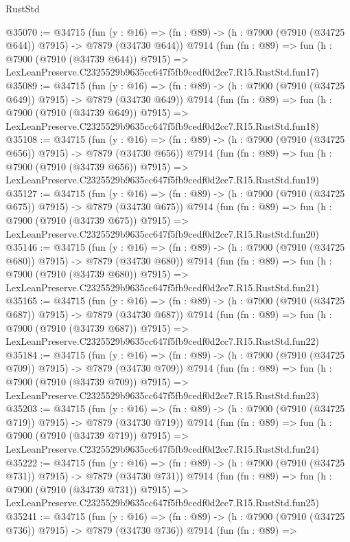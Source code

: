 \begin{lexlean}{RustStd}
\begin{coremodule}
@35070 := @34715
    (fun (y : @16) => (fn : @89) -> (h : @7900 (@7910 (@34725 @644)) @7915) -> @7879 (@34730 @644))
    @7914
    (fun (fn : @89) =>
    fun (h : @7900 (@7910 (@34739 @644)) @7915) =>
    LexLeanPreserve.C2325529b9635cc647f5fb9cedf0d2cc7.R15.RustStd.fun17)
@35089 := @34715
    (fun (y : @16) => (fn : @89) -> (h : @7900 (@7910 (@34725 @649)) @7915) -> @7879 (@34730 @649))
    @7914
    (fun (fn : @89) =>
    fun (h : @7900 (@7910 (@34739 @649)) @7915) =>
    LexLeanPreserve.C2325529b9635cc647f5fb9cedf0d2cc7.R15.RustStd.fun18)
@35108 := @34715
    (fun (y : @16) => (fn : @89) -> (h : @7900 (@7910 (@34725 @656)) @7915) -> @7879 (@34730 @656))
    @7914
    (fun (fn : @89) =>
    fun (h : @7900 (@7910 (@34739 @656)) @7915) =>
    LexLeanPreserve.C2325529b9635cc647f5fb9cedf0d2cc7.R15.RustStd.fun19)
@35127 := @34715
    (fun (y : @16) => (fn : @89) -> (h : @7900 (@7910 (@34725 @675)) @7915) -> @7879 (@34730 @675))
    @7914
    (fun (fn : @89) =>
    fun (h : @7900 (@7910 (@34739 @675)) @7915) =>
    LexLeanPreserve.C2325529b9635cc647f5fb9cedf0d2cc7.R15.RustStd.fun20)
@35146 := @34715
    (fun (y : @16) => (fn : @89) -> (h : @7900 (@7910 (@34725 @680)) @7915) -> @7879 (@34730 @680))
    @7914
    (fun (fn : @89) =>
    fun (h : @7900 (@7910 (@34739 @680)) @7915) =>
    LexLeanPreserve.C2325529b9635cc647f5fb9cedf0d2cc7.R15.RustStd.fun21)
@35165 := @34715
    (fun (y : @16) => (fn : @89) -> (h : @7900 (@7910 (@34725 @687)) @7915) -> @7879 (@34730 @687))
    @7914
    (fun (fn : @89) =>
    fun (h : @7900 (@7910 (@34739 @687)) @7915) =>
    LexLeanPreserve.C2325529b9635cc647f5fb9cedf0d2cc7.R15.RustStd.fun22)
@35184 := @34715
    (fun (y : @16) => (fn : @89) -> (h : @7900 (@7910 (@34725 @709)) @7915) -> @7879 (@34730 @709))
    @7914
    (fun (fn : @89) =>
    fun (h : @7900 (@7910 (@34739 @709)) @7915) =>
    LexLeanPreserve.C2325529b9635cc647f5fb9cedf0d2cc7.R15.RustStd.fun23)
@35203 := @34715
    (fun (y : @16) => (fn : @89) -> (h : @7900 (@7910 (@34725 @719)) @7915) -> @7879 (@34730 @719))
    @7914
    (fun (fn : @89) =>
    fun (h : @7900 (@7910 (@34739 @719)) @7915) =>
    LexLeanPreserve.C2325529b9635cc647f5fb9cedf0d2cc7.R15.RustStd.fun24)
@35222 := @34715
    (fun (y : @16) => (fn : @89) -> (h : @7900 (@7910 (@34725 @731)) @7915) -> @7879 (@34730 @731))
    @7914
    (fun (fn : @89) =>
    fun (h : @7900 (@7910 (@34739 @731)) @7915) =>
    LexLeanPreserve.C2325529b9635cc647f5fb9cedf0d2cc7.R15.RustStd.fun25)
@35241 := @34715
    (fun (y : @16) => (fn : @89) -> (h : @7900 (@7910 (@34725 @736)) @7915) -> @7879 (@34730 @736))
    @7914
    (fun (fn : @89) =>

\end{coremodule}
\end{lexlean}
